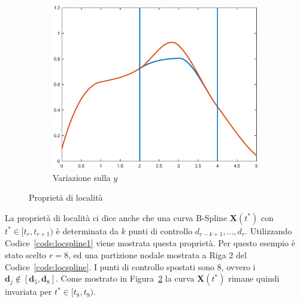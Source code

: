 \documentclass[a4paper, 10pt]{article}
\begin{document}
\begin{figure}[]
\begin{subfigure}[b]{0.3\textwidth}
      \includegraphics[width=\textwidth]{figure/loc1.eps}
      \caption{Variazione sulla $y$}
      \label{fig:loc1}
  \end{subfigure}
  \caption{Proprietà di località}\label{fig:loc_spline1}
\end{figure}

La proprietà di località ci dice anche che una curva B-Spline $\mathbf{X}(t^*)$ con $t^* \in [t_r, t_{r+1})$ è determinata da 
$k$ punti di controllo $d_{r-k+1}, \dots, d_{r}$. 
Utilizzando Codice~\ref{code:locspline1} viene mostrata questa proprietà. Per questo esempio è stato scelto
$r = 8$, ed una partizione nodale mostrata a Riga 2 del Codice~\ref{code:locspline}.
I  punti di controllo spostati sono $8$, ovvero i $\mathbf{d}_j \notin [\mathbf{d}_{5}, \mathbf{d}_{8}]$.
Come mostrato in Figura~\ref{fig:loc_spline1} la curva  $\mathbf{X}(t^*)$  rimane quindi invariata per $t^* \in [t_{8}, t_{9})$. 


\end{document}
